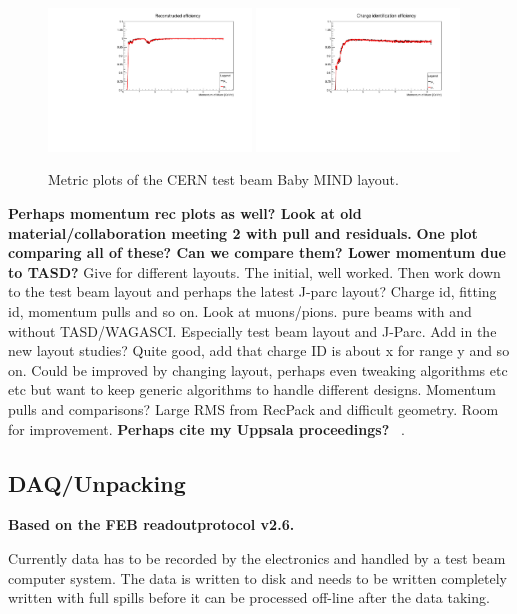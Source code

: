 \begin{figure}[h!]
\centering
\includegraphics[width=0.48\textwidth]{figures/oldStudies/FullFitted.pdf}
\includegraphics[width=0.48\textwidth]{figures/oldStudies/FullChargeID.pdf}
\caption{Metric plots of the CERN test beam Baby MIND layout.}
\label{fig:TestBeamMIND2}
\end{figure}

\textbf{Perhaps momentum rec plots as well? Look at old material/collaboration meeting 2 with pull and residuals.}
\textbf{One plot comparing all of these? Can we compare them? Lower momentum due to TASD?}
Give for different layouts. The initial, well worked. Then work down to the test beam layout and perhaps the latest J-parc layout? 
Charge id, fitting id, momentum pulls and so on.
Look at muons/pions. pure beams with and without TASD/WAGASCI. Especially test beam layout and J-Parc.
Add in the new layout studies?
Quite good, add that charge ID is about x for range y and so on.  Could be improved by changing layout, perhaps even tweaking algorithms etc etc but want to keep generic algorithms to handle different designs.
Momentum pulls and comparisons? Large RMS from RecPack and difficult geometry. Room for improvement.
\textbf{Perhaps cite my Uppsala proceedings?} ~\cite{82Uppsala}.
\fi

\subsection{DAQ/Unpacking}

\textbf{Based on the FEB readoutprotocol v2.6.}

Currently data has to be recorded by the electronics and handled by a test beam computer system. The data is written to disk and needs to be written completely written with full spills before it can be processed off-line after the data taking.

